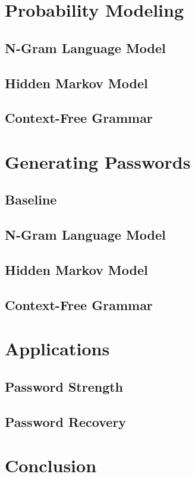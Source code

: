 \documentclass{amsart}
\theoremstyle{definition}
\theoremstyle{remark}
\numberwithin{equation}{section}
\begin{document}
\section{Probability Modeling}
\subsection{N-Gram Language Model}
\subsection{Hidden Markov Model}
\subsection{Context-Free Grammar}

\section{Generating Passwords}
\subsection{Baseline}
\subsection{N-Gram Language Model}
\subsection{Hidden Markov Model}
\subsection{Context-Free Grammar}

\section{Applications}
\subsection{Password Strength}
\subsection{Password Recovery}

\section{Conclusion}
\end{document}
